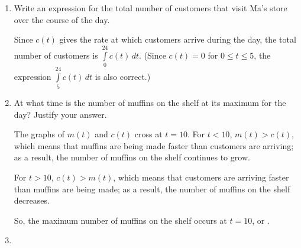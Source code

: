 \documentclass{article}
\begin{document}
\begin{enumerate}
\begin{enumerate}
\begin{multicols}{2}
\begin{enumerate}[label=\protect{\maybecircle{\Alph*.}},
        itemsep=0.2cm]
      \plainitem $\displaystyle \int_0^5 c(t)\,dt$
      \plainitem $\displaystyle \int_0^{10} m(t) \,dt$
      \end{enumerate}
    \end{multicols}

    \begin{solution}
      The first customer arrives at time $t = 5$, so we are looking for
      the number of muffins made between time $t = 0$ and $t = 5$, which
      is $\displaystyle \int_0^5 m(t)\,dt$.  Expressions B,
        and D are all ways of writing this.
    \end{solution}

  \item
    \begin{problem}[\vfill]
      Write an expression for the total number of customers that visit
      Ma's store over the course of the day.
    \end{problem}

    \begin{solution}
      Since $c(t)$ gives the rate at which customers arrive during the
      day, the total number of customers is $\boxed{\int\limits_0^{24}
        c(t) \,dt}$. (Since $c(t) = 0$ for $0 \leq t \leq 5$, the
      expression $\boxed{\int\limits_5^{24} c(t) \,dt}$ is also correct.)
    \end{solution}

  \item
    \begin{problem}[\vfill\newpage]
      At what time is the number of muffins on the shelf at its maximum
      for the day? Justify your answer.
    \end{problem}

    \begin{solution}
      The graphs of $m(t)$ and $c(t)$ cross at $t = 10$. For $t < 10$,
      $m(t) > c(t)$, which means that muffins are being made faster than
      customers are arriving; as a result, the number of muffins on the
      shelf continues to grow.

      For $t > 10$, $c(t) > m(t)$, which means that customers are arriving
      faster than muffins are being made; as a result, the number of
      muffins on the shelf decreases.

      So, the maximum number of muffins on the shelf occurs at $t = 10$,
      or .
    \end{solution}

  \item


\end{enumerate}
\end{enumerate}
\end{document}
